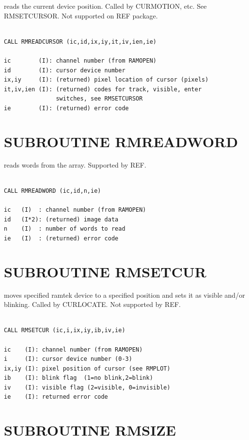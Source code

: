 \documentclass[11pt]{report}
\begin{document}
 reads the current   device position.
Called by CURMOTION, etc.  See RMSETCURSOR.  Not supported on REF package.
\begin{verbatim}

CALL RMREADCURSOR (ic,id,ix,iy,it,iv,ien,ie)

ic        (I): channel number (from RAMOPEN)
id        (I): cursor device number
ix,iy     (I): (returned) pixel location of cursor (pixels)
it,iv,ien (I): (returned) codes for track, visible, enter
               switches, see RMSETCURSOR
ie        (I): (returned) error code
\end{verbatim}

\section{SUBROUTINE RMREADWORD}

 reads  words from the   array.
Supported by REF. 
\begin{verbatim}

CALL RMREADWORD (ic,id,n,ie)

ic   (I)  : channel number (from RAMOPEN)
id   (I*2): (returned) image data
n    (I)  : number of words to read
ie   (I)  : (returned) error code
\end{verbatim}

\section{SUBROUTINE RMSETCUR}

 moves specified ramtek  device to a specified position and
sets it as visible and/or blinking.  Called by CURLOCATE.  Not supported
by REF.
\begin{verbatim}

CALL RMSETCUR (ic,i,ix,iy,ib,iv,ie)

ic    (I): channel number (from RAMOPEN)
i     (I): cursor device number (0-3)
ix,iy (I): pixel position of cursor (see RMPLOT)
ib    (I): blink flag  (1=no blink,2=blink)
iv    (I): visible flag (2=visible, 0=invisible)
ie    (I): returned error code
\end{verbatim}

\section{SUBROUTINE  RMSIZE}
\end{document}
